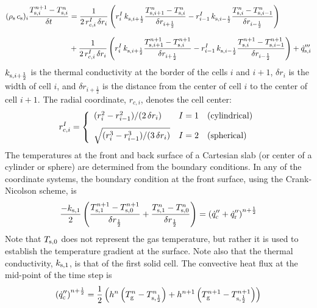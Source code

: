 \begin{align}
\label{crank-nicolson}
(\rho_{\rm s} \, c_{\rm s})_i \frac{T_{{\rm s},i}^{n+1}-T_{{\rm s},i}^{n}}{\delta t}
& = \frac{1}{2 \, r_{c,i}^I \, \delta r_i} \left( r_{i}^{I} \, k_{{\rm s},i+\frac{1}{2}} \frac{T_{{\rm s},i+1}^{n}-T_{{\rm s},i}^{n}}{\delta r_{i+\frac{1}{2}}} - r_{i-1}^{I} \, k_{{\rm s},i-\frac{1}{2}} \frac{T_{{\rm s},i}^{n}-T_{{\rm s},i-1}^{n}}{\delta r_{i-\frac{1}{2}}} \right) \notag \\[0.1in]
& +\frac{1}{2 \, r_{c,i}^I \, \delta r_i} \left( r_{i}^{I} \, k_{{\rm s},i+\frac{1}{2}} \frac{T_{{\rm s},i+1}^{n+1}-T_{{\rm s},i}^{n+1}}{\delta r_{i+\frac{1}{2}}} - r_{i-1}^{I} \, k_{{\rm s},i-\frac{1}{2}} \frac{T_{{\rm s},i}^{n+1}-T_{{\rm s},i-1}^{n+1}}{\delta r_{i-\frac{1}{2}}} \right) + \dot{q}'''_{{\rm s},i}
\end{align}
$k_{{\rm s},i+\frac{1}{2}}$ is the thermal conductivity at the border of the cells $i$ and $i+1$, $\delta r_i$ is the width of cell $i$, and  $\delta r_{i+\frac{1}{2}}$ is the distance from the center of cell $i$ to the center of cell $i+1$. The radial coordinate, $r_{c,i}$, denotes the cell center:
\begin{equation}
r_{c,i}^I = \left\{
\begin{array}{ll} (r_i^2 - r_{i-1}^2)/(2 \, \delta r_i)            & I=1 \quad \hbox{(cylindrical)} \\ [0.1in]
                   \sqrt{ ( r_i^3 - r_{i-1}^3)/(3 \, \delta r_i) } & I=2 \quad \hbox{(spherical)}
\end{array} \right.
\end{equation}
The temperatures at the front and back surface of a Cartesian slab (or center of a cylinder or sphere) are determined from the boundary conditions. In any of the coordinate systems, the boundary condition at the front surface, using the Crank-Nicolson scheme, is
\begin{equation}
\label{bc_front}
 \frac{-k_{\rm s,1}}{2} \left( \frac{T_{\rm s,1}^{n+1}-T_{\rm s,0}^{n+1}}{\delta r_{\frac{1}{2}}} + \frac{T_{\rm s,1}^{n}-T_{\rm s,0}^{n}}{\delta r_{\frac{1}{2}}} \right)
  =  \left( \dot{q}_{\rm c}''+\dot{q}_{\rm r}'' \right)^{n+\frac{1}{2}}
\end{equation}
Note that $T_{\rm s,0}$ does not represent the gas temperature, but rather it is used to establish the temperature gradient at the surface. Note also that the thermal conductivity, $k_{\rm s,1}$, is that of the first solid cell. The convective heat flux at the mid-point of the time step is
\begin{equation}
\label{conv}
  \left( \dot{q}_{\rm c}'' \right)^{n+\frac{1}{2}} = \frac{1}{2} \left( h^n \left(T_{\rm g}^n - T_{\rm s,\frac{1}{2}}^n\right) + h^{n+1} \left(T_{\rm g}^{n+1} - T_{\rm s,\frac{1}{2}}^{n+1} \right) \right)
\end{equation}
